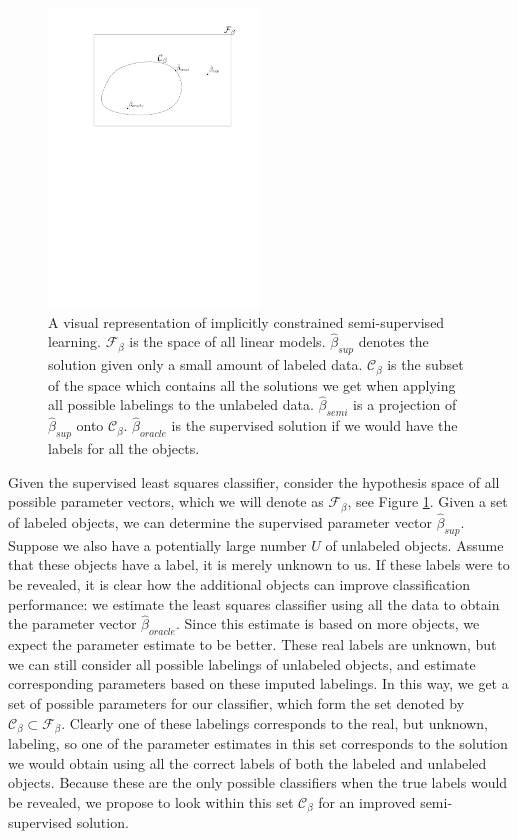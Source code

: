 \documentclass{llncs}
\newcommand{\Nunl}{U}
\begin{document}
\begin{figure}[h] 
  \centering
      \includegraphics[width=0.5\textwidth]{constrainedspace.pdf}
  \caption{A visual representation of implicitly constrained semi-supervised learning. $\mathcal{F}_{\beta}$ is the space of all linear models. $\hat{\beta}_{sup}$ denotes the solution given only a small amount of labeled data. $\mathcal{C}_{\beta}$ is the subset of the space which contains all the solutions we get when applying all possible labelings to the unlabeled data. $\hat{\beta}_{semi}$ is a projection of $\hat{\beta}_{sup}$ onto $\mathcal{C}_{\beta}$. $\hat{\beta}_{oracle}$ is the supervised solution if we would have the labels for all the objects.} \label{fig:constrainedsubset}
\end{figure}

Given the supervised least squares classifier, consider the hypothesis space of all possible parameter vectors, which we will denote as $\mathcal{F}_{\beta}$, see Figure \ref{fig:constrainedsubset}. Given a set of labeled objects, we can determine the supervised parameter vector $\hat{\beta}_{sup}$. Suppose we also have a potentially large number $\Nunl$ of unlabeled objects. Assume that these objects have a label, it is merely unknown to us. If these labels were to be revealed, it is clear how the additional objects can improve classification performance: we estimate the least squares classifier using all the data to obtain the parameter vector $\hat{\beta}_{oracle}$. Since this estimate is based on more objects, we expect the parameter estimate to be better. These real labels are unknown, but we can still consider all possible labelings of unlabeled objects, and estimate corresponding parameters based on these imputed labelings. In this way, we get a set of possible parameters for our classifier, which form the set denoted by $\mathcal{C}_{\beta} \subset \mathcal{F}_{\beta}$. Clearly one of these labelings corresponds to the real, but unknown, labeling, so one of the parameter estimates in this set corresponds to the solution we would obtain using all the correct labels of both the labeled and unlabeled objects. Because these are the only possible classifiers when the true labels would be revealed, we propose to look within this set $\mathcal{C}_{\beta}$ for an improved semi-supervised solution. 
\end{document}
